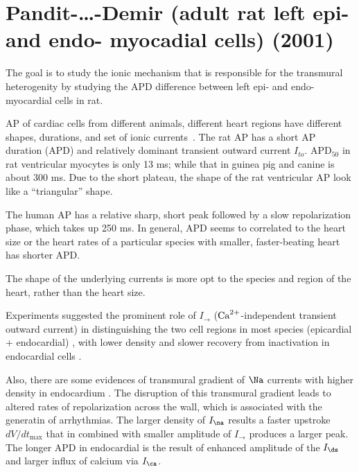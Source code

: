 \section{Pandit-\ldots-Demir (adult rat left epi- and endo- myocadial cells)
(2001)}
\label{sec:pandit_2001_rat}

The goal is to study the ionic mechanism that is responsible for the transmural
heterogenity by studying the APD difference between left epi- and endo-
myocardial cells in rat.

\begin{framed}
  AP of cardiac cells from different animals, different heart regions
  have different shapes, durations, and set of ionic
  currents~\citep{fedida1991rva,liu1995cdr,guo1999mbt}.  The rat AP
  has a short AP duration (APD) and relatively dominant transient
  outward current $I_{to}$. APD$_{50}$ in rat ventricular myocytes is
  only 13 ms; while that in guinea pig and canine is about 300
  ms. Due to the short plateau, the shape of the rat ventricular AP
  look like a ``triangular'' shape.

  The human AP has a relative sharp, short peak followed by a slow
  repolarization phase, which takes up 250 ms. In general, APD seems
  to correlated to the heart size or the heart rates of a particular
  species with smaller, faster-beating heart has shorter APD.

  The shape of the underlying currents is more opt to the species and
  region of the heart, rather than the heart size.
\end{framed}

Experiments suggested the prominent role of $I_\to$ (${\text{Ca}^{2+}}$-independent transient
outward current) in distinguishing the two cell regions in most species
(epicardial + endocardial) \citep{Campbell1995,giles1996}, with lower density
and slower recovery from inactivation in endocardial cells \citep{clark1993,
shimoni1995}.

Also, there are some evidences of transmural gradient of $\Na$ currents with
higher density in endocardium \citep{ashamalla2001}. The disruption of this
transmural gradient leads to altered rates of repolarization across the wall,
which is associated with the generatin of arrhythmias. The larger density of
$I_\na$ results a faster upstroke $dV/dt_\max$ that in combined with smaller
amplitude of $I_\to$ produces a larger peak. The longer APD in endocardial is
the result of enhanced amplitude of the $I_\ds$ and larger influx of calcium via
$I_\ca$.

